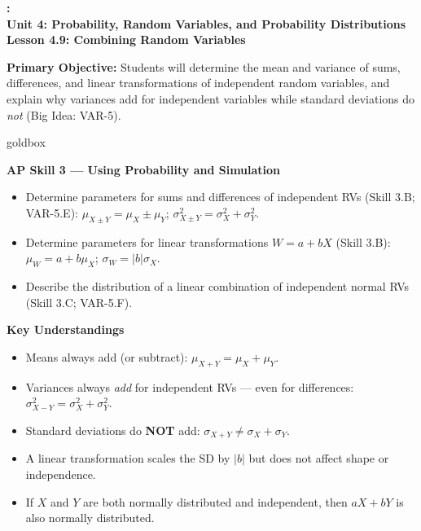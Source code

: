 \documentclass[10pt]{article}
\newcommand{\UnitNumberName}{Unit 4: Probability, Random Variables, and Probability Distributions \quad}
\newcommand{\LessonNumberName}{Lesson 4.9: Combining Random Variables}
\begin{document}
\begin{center}
    {\Large\bfseries \CourseName: \SchoolYear \\
    {\small\bfseries \UnitNumberName \LessonNumberName}}
\end{center}

\begin{tcolorbox}[colback=sky, colframe=navy, boxrule=0.9pt, arc=2mm,
    left=2mm, right=2mm, top=1.5mm, bottom=1.5mm]
    \textbf{Primary Objective:} Students will determine the mean and variance of sums,
    differences, and linear transformations of independent random variables, and explain
    why variances add for independent variables while standard deviations do \emph{not}
    (Big Idea: VAR-5).
\end{tcolorbox}

\renewcommand{\arraystretch}{1.6}
\begin{skillbox}{goldbox}
\begin{minipage}[t]{0.48\linewidth}
    \textbf{AP Skill 3 --- Using Probability and Simulation}
    \begin{itemize}
        \item Determine parameters for sums and differences of independent RVs
              (Skill 3.B; VAR-5.E): $\mu_{X \pm Y} = \mu_X \pm \mu_Y$;
              $\sigma^2_{X \pm Y} = \sigma^2_X + \sigma^2_Y$.
        \item Determine parameters for linear transformations $W = a + bX$
              (Skill 3.B): $\mu_W = a + b\mu_X$; $\sigma_W = |b|\sigma_X$.
        \item Describe the distribution of a linear combination of independent normal RVs
              (Skill 3.C; VAR-5.F).
    \end{itemize}
\end{minipage}
\hfill
\begin{minipage}[t]{0.48\linewidth}
    \textbf{Key Understandings}
    \begin{itemize}
        \item Means always add (or subtract): $\mu_{X+Y} = \mu_X + \mu_Y$.
        \item Variances always \emph{add} for independent RVs --- even for differences:
              $\sigma^2_{X-Y} = \sigma^2_X + \sigma^2_Y$.
        \item Standard deviations do \textbf{NOT} add: $\sigma_{X+Y} \ne \sigma_X + \sigma_Y$.
        \item A linear transformation scales the SD by $|b|$ but does not affect shape
              or independence.
        \item If $X$ and $Y$ are both normally distributed and independent, then
              $aX + bY$ is also normally distributed.
    \end{itemize}
\end{minipage}
\end{skillbox}
\end{document}
